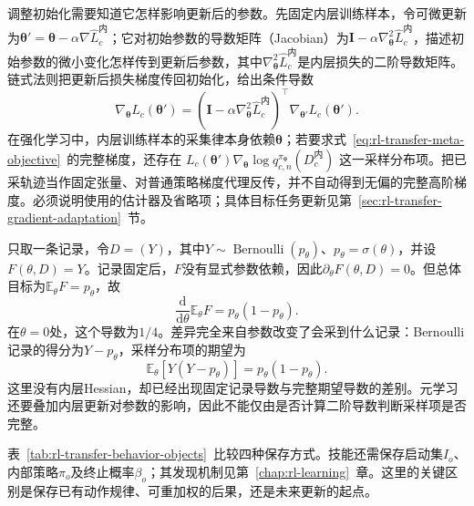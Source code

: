 调整初始化需要知道它怎样影响更新后的参数。先固定内层训练样本，令可微更新为$\bm\theta'=\bm\theta-\alpha\nabla\widehat L_c^{\text{内}}$；它对初始参数的导数矩阵（Jacobian）为$\bm I-\alpha\nabla_{\bm\theta}^2\widehat L_c^{\text{内}}$，描述初始参数的微小变化怎样传到更新后参数，其中$\nabla_{\bm\theta}^2\widehat L_c^{\text{内}}$是内层损失的二阶导数矩阵。链式法则把更新后损失梯度传回初始化，给出条件导数
\[
 \nabla_{\bm\theta}L_c(\bm\theta')
 =\left(\bm I-\alpha\nabla_{\bm\theta}^2\widehat L_c^{\text{内}}\right)^\top
       \nabla_{\bm\theta'}L_c(\bm\theta').
\]
在强化学习中，内层训练样本的采集律本身依赖$\bm\theta$；若要求式~\eqref{eq:rl-transfer-meta-objective}~的完整梯度，还存在
$L_c(\bm\theta')\nabla_{\bm\theta}\log q_{c,n}^{\pi_{\bm\theta}}(D_c^{\text{内}})$
这一采样分布项。把已采轨迹当作固定张量、对普通策略梯度代理反传，并不自动得到无偏的完整高阶梯度。必须说明使用的估计器及省略项；具体目标任务更新见第~\ref{sec:rl-transfer-gradient-adaptation}~节。

\begin{example}[固定样本求导为何会漏掉采样分布项]
  \label{ex:rl-transfer-sampling-gradient}
  只取一条记录，令$D=(Y)$，其中$Y\sim\operatorname{Bernoulli}(p_\theta)$、$p_\theta=\sigma(\theta)$，并设$F(\theta,D)=Y$。记录固定后，$F$没有显式参数依赖，因此$\partial_\theta F(\theta,D)=0$。但总体目标为$\mathbb E_\theta F=p_\theta$，故
  \[
    \frac{\mathrm d}{\mathrm d\theta}\mathbb E_\theta F
       =p_\theta(1-p_\theta).
  \]
  在$\theta=0$处，这个导数为$1/4$。差异完全来自参数改变了会采到什么记录：Bernoulli记录的得分为$Y-p_\theta$，采样分布项的期望为
  \[
    \mathbb E_\theta[Y(Y-p_\theta)]=p_\theta(1-p_\theta).
  \]
  这里没有内层Hessian，却已经出现固定记录导数与完整期望导数的差别。元学习还要叠加内层更新对参数的影响，因此不能仅由是否计算二阶导数判断采样项是否完整。
\end{example}

表~\ref{tab:rl-transfer-behavior-objects}~比较四种保存方式。技能还需保存启动集$I_o$、内部策略$\pi_o$及终止概率$\beta_o$；其发现机制见第~\ref{chap:rl-learning}~章。这里的关键区别是保存已有动作规律、可重加权的后果，还是未来更新的起点。


